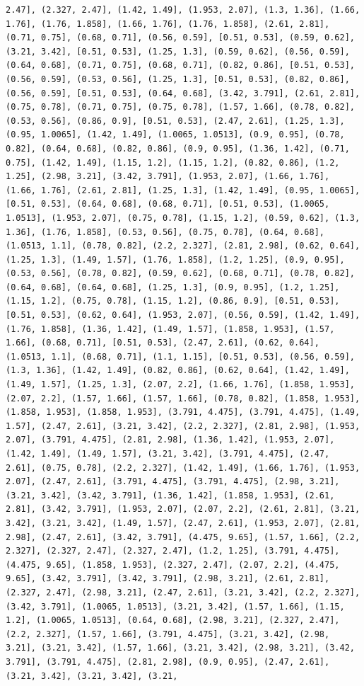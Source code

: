 \documentclass[12pt,fleqn]{article}\usepackage{../common}
\begin{document}
\begin{verbatim}
2.47], (2.327, 2.47], (1.42, 1.49], (1.953, 2.07], (1.3, 1.36], (1.66, 1.76], (1.76, 1.858], (1.66, 1.76], (1.76, 1.858], (2.61, 2.81], (0.71, 0.75], (0.68, 0.71], (0.56, 0.59], [0.51, 0.53], (0.59, 0.62], (3.21, 3.42], [0.51, 0.53], (1.25, 1.3], (0.59, 0.62], (0.56, 0.59], (0.64, 0.68], (0.71, 0.75], (0.68, 0.71], (0.82, 0.86], [0.51, 0.53], (0.56, 0.59], (0.53, 0.56], (1.25, 1.3], [0.51, 0.53], (0.82, 0.86], (0.56, 0.59], [0.51, 0.53], (0.64, 0.68], (3.42, 3.791], (2.61, 2.81], (0.75, 0.78], (0.71, 0.75], (0.75, 0.78], (1.57, 1.66], (0.78, 0.82], (0.53, 0.56], (0.86, 0.9], [0.51, 0.53], (2.47, 2.61], (1.25, 1.3], (0.95, 1.0065], (1.42, 1.49], (1.0065, 1.0513], (0.9, 0.95], (0.78, 0.82], (0.64, 0.68], (0.82, 0.86], (0.9, 0.95], (1.36, 1.42], (0.71, 0.75], (1.42, 1.49], (1.15, 1.2], (1.15, 1.2], (0.82, 0.86], (1.2, 1.25], (2.98, 3.21], (3.42, 3.791], (1.953, 2.07], (1.66, 1.76], (1.66, 1.76], (2.61, 2.81], (1.25, 1.3], (1.42, 1.49], (0.95, 1.0065], [0.51, 0.53], (0.64, 0.68], (0.68, 0.71], [0.51, 0.53], (1.0065, 1.0513], (1.953, 2.07], (0.75, 0.78], (1.15, 1.2], (0.59, 0.62], (1.3, 1.36], (1.76, 1.858], (0.53, 0.56], (0.75, 0.78], (0.64, 0.68], (1.0513, 1.1], (0.78, 0.82], (2.2, 2.327], (2.81, 2.98], (0.62, 0.64], (1.25, 1.3], (1.49, 1.57], (1.76, 1.858], (1.2, 1.25], (0.9, 0.95], (0.53, 0.56], (0.78, 0.82], (0.59, 0.62], (0.68, 0.71], (0.78, 0.82], (0.64, 0.68], (0.64, 0.68], (1.25, 1.3], (0.9, 0.95], (1.2, 1.25], (1.15, 1.2], (0.75, 0.78], (1.15, 1.2], (0.86, 0.9], [0.51, 0.53], [0.51, 0.53], (0.62, 0.64], (1.953, 2.07], (0.56, 0.59], (1.42, 1.49], (1.76, 1.858], (1.36, 1.42], (1.49, 1.57], (1.858, 1.953], (1.57, 1.66], (0.68, 0.71], [0.51, 0.53], (2.47, 2.61], (0.62, 0.64], (1.0513, 1.1], (0.68, 0.71], (1.1, 1.15], [0.51, 0.53], (0.56, 0.59], (1.3, 1.36], (1.42, 1.49], (0.82, 0.86], (0.62, 0.64], (1.42, 1.49], (1.49, 1.57], (1.25, 1.3], (2.07, 2.2], (1.66, 1.76], (1.858, 1.953], (2.07, 2.2], (1.57, 1.66], (1.57, 1.66], (0.78, 0.82], (1.858, 1.953], (1.858, 1.953], (1.858, 1.953], (3.791, 4.475], (3.791, 4.475], (1.49, 1.57], (2.47, 2.61], (3.21, 3.42], (2.2, 2.327], (2.81, 2.98], (1.953, 2.07], (3.791, 4.475], (2.81, 2.98], (1.36, 1.42], (1.953, 2.07], (1.42, 1.49], (1.49, 1.57], (3.21, 3.42], (3.791, 4.475], (2.47, 2.61], (0.75, 0.78], (2.2, 2.327], (1.42, 1.49], (1.66, 1.76], (1.953, 2.07], (2.47, 2.61], (3.791, 4.475], (3.791, 4.475], (2.98, 3.21], (3.21, 3.42], (3.42, 3.791], (1.36, 1.42], (1.858, 1.953], (2.61, 2.81], (3.42, 3.791], (1.953, 2.07], (2.07, 2.2], (2.61, 2.81], (3.21, 3.42], (3.21, 3.42], (1.49, 1.57], (2.47, 2.61], (1.953, 2.07], (2.81, 2.98], (2.47, 2.61], (3.42, 3.791], (4.475, 9.65], (1.57, 1.66], (2.2, 2.327], (2.327, 2.47], (2.327, 2.47], (1.2, 1.25], (3.791, 4.475], (4.475, 9.65], (1.858, 1.953], (2.327, 2.47], (2.07, 2.2], (4.475, 9.65], (3.42, 3.791], (3.42, 3.791], (2.98, 3.21], (2.61, 2.81], (2.327, 2.47], (2.98, 3.21], (2.47, 2.61], (3.21, 3.42], (2.2, 2.327], (3.42, 3.791], (1.0065, 1.0513], (3.21, 3.42], (1.57, 1.66], (1.15, 1.2], (1.0065, 1.0513], (0.64, 0.68], (2.98, 3.21], (2.327, 2.47], (2.2, 2.327], (1.57, 1.66], (3.791, 4.475], (3.21, 3.42], (2.98, 3.21], (3.21, 3.42], (1.57, 1.66], (3.21, 3.42], (2.98, 3.21], (3.42, 3.791], (3.791, 4.475], (2.81, 2.98], (0.9, 0.95], (2.47, 2.61], (3.21, 3.42], (3.21, 3.42], (3.21, 
\end{verbatim}
\end{document}
